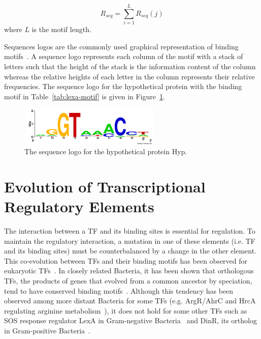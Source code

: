 \begin{equation}
  \label{eq:1}
  R_{seq} = \displaystyle\sum_{i=1}^L R_{seq}(j)
\end{equation}
where $L$ is the motif length.

Sequences logos are the commonly used graphical representation of binding
motifs~\cite{schneider1990sequence, crooks2004weblogo}. A sequence logo
represents each column of the motif with a stack of letters such that the
height of the stack is the information content of the column whereas the
relative heights of each letter in the column represents their relative
frequencies. The sequence logo for the hypothetical protein with the binding
motif in Table~\ref{tab:lexa-motif} is given in Figure~\ref{fig:lexa}.

\begin{figure}
  \centering
  \includegraphics[width=0.6\textwidth]{figures/chapter1/hyp.png}
  \caption{The sequence logo for the hypothetical protein Hyp.}
  \label{fig:lexa}
\end{figure}

\section{Evolution of Transcriptional Regulatory Elements}

The interaction between a TF and its binding sites is essential for
regulation. To maintain the regulatory interaction, a mutation in one of these
elements (i.e. TF and its binding sites) must be counterbalanced by a change in
the other element. This co-evolution between TFs and their binding motifs has
been observed for eukaryotic TFs~\cite{yang2011correlated}. In closely related
Bacteria, it has been shown that orthologous TFs, the products of genes that
evolved from a common ancestor by speciation, tend to have conserved binding
motifs~\cite{makarova2001conservation}. Although this tendency has been
observed among more distant Bacteria for some TFs (e.g. ArgR/AhrC and HrcA
regulating arginine metabolism~\cite{maas1994arginine, klingel1995binding}), it
does not hold for some other TFs such as SOS response regulator LexA in
Gram-negative Bacteria~\cite{walker1985inducible} and DinR, its ortholog in
Gram-positive Bacteria~\cite{winterling1998bacillus}.

